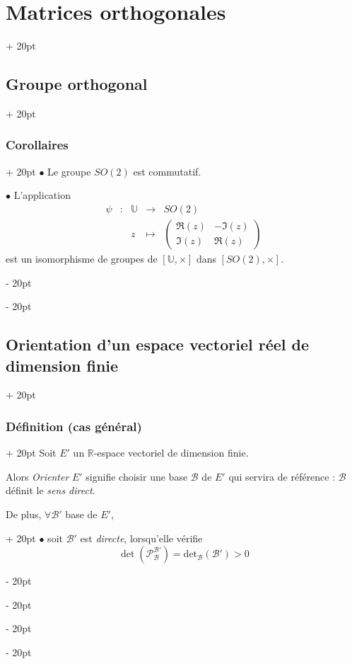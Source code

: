 \documentclass[a4paper, 12pt, twoside]{article}
\newcommand{\R}{\mathbb{R}} %
\newcommand{\U}{\mathbb{U}} %
\newcommand{\lr}[1]{\left( #1 \right)}
\newcommand{\ind}[1][20pt]{\advance\leftskip + #1}
\newcommand{\deind}[1][20pt]{\advance\leftskip - #1}
\newenvironment{indt}[2][20pt]{#2 \par \ind[#1]}{\par \deind} %
\begin{document}
\begin{indt}{\section{Matrices orthogonales}}
\begin{indt}{\subsection{Groupe orthogonal}}
            \begin{indt}{\subsubsection{Corollaires}}
                $\bullet$ Le groupe $SO(2)$ est commutatif.

                \vspace{12pt}
                
                $\bullet$ L'application
                \[
                    \begin{array}{ccccl}
                        \psi & : & \U & \longrightarrow & SO(2)
                        \\
                         && z & \longmapsto &
                         \begin{pmatrix}
                             \Re(z) & -\Im(z)
                             \\
                             \Im(z) & \Re(z)
                         \end{pmatrix}
                    \end{array}
                \]
                est un isomorphisme de groupes de $[\U, \times]$ dans $[SO(2), \times]$.
            \end{indt}
        \end{indt}

        \vspace{12pt}
        
        \begin{indt}{\subsection{Orientation d'un espace vectoriel réel de dimension finie}}
            \begin{indt}{\subsubsection{Définition (cas général)}}
                Soit $E'$ un $\R$-espace vectoriel de dimension finie.

                Alors \emph{Orienter} $E'$ signifie choisir une base $\mathcal B$ de $E'$ qui servira de référence : $\mathcal B$ définit le \emph{sens direct}.

                \begin{indt}{De plus, $\forall \mathcal B'$ base de $E'$,}
                    $\bullet$ soit $\mathcal B'$ est \emph{directe}, lorsqu'elle vérifie
                    \[
                        \det\!\lr{\mathcal P_{\mathcal B}^{\mathcal B'}} = \mathrm{det}_{\mathcal B}(\mathcal B') > 0
                    \]


\end{indt}
\end{indt}
\end{indt}
\end{indt}
\end{document}
